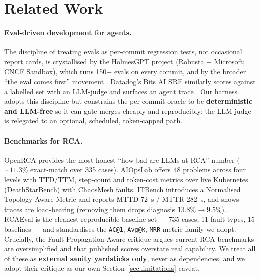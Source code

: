 \documentclass[11pt]{article}
\makeatletter
\newcommand{\acone}{\texttt{AC@1}}
\newcommand{\code}[1]{\texttt{#1}}
\makeatother
\begin{document}
\section{Related Work}

\paragraph{Eval-driven development for agents.}
The discipline of treating evals as per-commit regression tests, not occasional report
cards, is crystallised by the HolmesGPT project (Robusta + Microsoft; CNCF Sandbox), which
runs 150+ evals on every commit, and by the broader ``the eval comes first'' movement
\citep{holmesgpt,evaldriven}. Datadog's Bits AI SRE similarly scores against a labelled set
with an LLM-judge and surfaces an agent trace \citep{datadog2026bits}. Our harness adopts
this discipline but constrains the per-commit oracle to be \textbf{deterministic and
LLM-free} so it can gate merges cheaply and reproducibly; the LLM-judge is relegated to an
optional, scheduled, token-capped path.

\paragraph{Benchmarks for RCA.}
OpenRCA \citep{xu2025openrca} provides the most honest ``how bad are LLMs at RCA'' number
(${\sim}11.3\%$ exact-match over 335 cases). AIOpsLab \citep{chen2025aiopslab} offers 48
problems across four levels with TTD/TTM, step-count and token-cost metrics over live
Kubernetes (DeathStarBench) with ChaosMesh faults. ITBench \citep{jha2025itbench}
introduces a Normalised Topology-Aware Metric and reports MTTD 72~s / MTTR 282~s, and shows
traces are load-bearing (removing them drops diagnosis $13.8\% \rightarrow 9.5\%$). RCAEval
\citep{pham2024rcaeval} is the cleanest reproducible baseline set --- 735 cases, 11 fault
types, 15 baselines --- and standardises the \acone{}, \code{Avg@k}, \code{MRR} metric
family we adopt. Crucially, the Fault-Propagation-Aware critique
\citep{rethinking2025faultprop} argues current RCA benchmarks are oversimplified and that
published scores overstate real capability. We treat all of these as \textbf{external
sanity yardsticks only}, never as dependencies, and we adopt their critique as our own
Section~\ref{sec:limitations} caveat.
\end{document}
